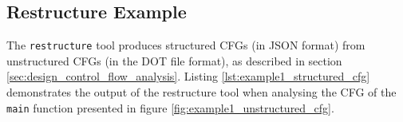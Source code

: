 
\subsection{Restructure Example}
\label{app:restructure_example}

The \texttt{restructure} tool produces structured CFGs (in JSON format) from unstructured CFGs (in the DOT file format), as described in section \ref{sec:design_control_flow_analysis}. Listing \ref{lst:example1_structured_cfg} demonstrates the output of the restructure tool when analysing the CFG of the \texttt{main} function presented in figure \ref{fig:example1_unstructured_cfg}.


